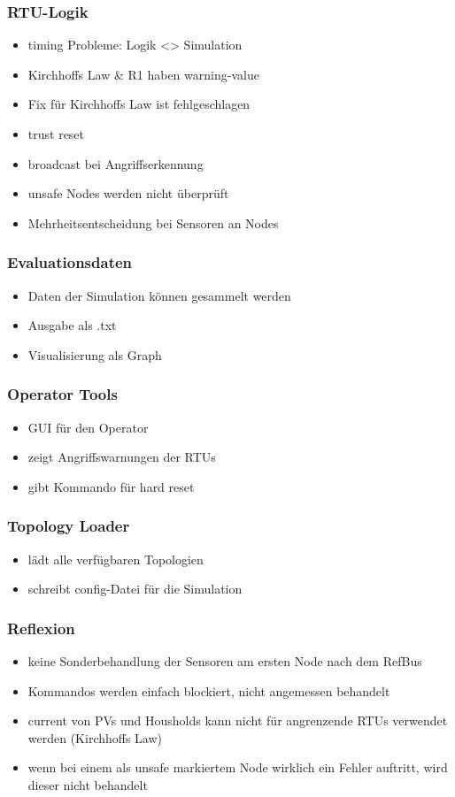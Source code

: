 \documentclass{beamer}
\begin{document}
\begin{frame}
	\frametitle{RTU-Logik}
	\begin{itemize}
		\item timing Probleme: Logik <> Simulation
		\item Kirchhoffs Law \& R1 haben warning-value
		\item Fix für Kirchhoffs Law ist fehlgeschlagen
		\item trust reset
		\item broadcast bei Angriffserkennung
		\item unsafe Nodes werden nicht überprüft
		\item Mehrheitsentscheidung bei Sensoren an Nodes
	\end{itemize}
\end{frame}

\begin{frame}
	\frametitle{Evaluationsdaten}
	\begin{itemize}
		\item Daten der Simulation können gesammelt werden
		\item Ausgabe als .txt
		\item Visualisierung als Graph
	\end{itemize}
\end{frame}

\begin{frame}
	\frametitle{Operator Tools}
	\begin{itemize}
		\item GUI für den Operator
		\item zeigt Angriffswarnungen der RTUs
		\item gibt Kommando für hard reset
	\end{itemize}
\end{frame}

\begin{frame}
	\frametitle{Topology Loader}
	\begin{itemize}
		\item lädt alle verfügbaren Topologien
		\item schreibt config-Datei für die Simulation
	\end{itemize}
\end{frame}

\begin{frame}
	\frametitle{Reflexion}
	\begin{itemize}
		\item keine Sonderbehandlung der Sensoren am ersten Node nach dem RefBus
		\item Kommandos werden einfach blockiert, nicht angemessen behandelt
		\item current von PVs und Housholds kann nicht für angrenzende RTUs verwendet werden (Kirchhoffs Law)
		\item wenn bei einem als unsafe markiertem Node wirklich ein Fehler auftritt, wird dieser nicht behandelt
	\end{itemize}
\end{frame}
\end{document}

